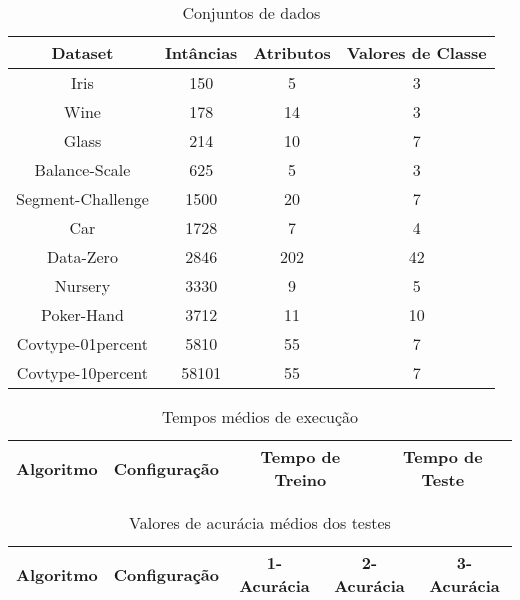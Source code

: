 \begin{table}[h!]
  \begin{center}
    \begin{tabular}{cccc}
      \hline
      Dataset & Intâncias & Atributos & Valores de Classe \\
      \hline

      Iris & 150 & 5 & 3 \\
      Wine & 178 & 14 & 3 \\ 
      Glass & 214 & 10 & 7 \\
      Balance-Scale & 625 & 5 & 3 \\
      Segment-Challenge & 1500 & 20 & 7 \\
      Car & 1728 & 7 & 4 \\
      Data-Zero & 2846 & 202 & 42 \\
      Nursery & 3330 & 9 & 5 \\
      Poker-Hand & 3712 & 11 & 10 \\      
      Covtype-01percent & 5810 & 55 & 7 \\
      Covtype-10percent & 58101 & 55 & 7 \\    

      \hline
    \end{tabular}
    \caption{Conjuntos de dados}
    \label{tab:datasets}
  \end{center}
\end{table}


\begin{table}[h!]
  \begin{center}
    \begin{tabular}{cccc}
      \hline
      Algoritmo & Configuração & Tempo de Treino & Tempo de Teste \\
      \hline


      \hline
    \end{tabular}
    \caption{Tempos médios de execução}
    \label{tab:tempostestes}
  \end{center}
\end{table}


\begin{table}[h!]
  \begin{center}
    \begin{tabular}{ccccc}
      \hline
      Algoritmo & Configuração & 1-Acurácia & 2-Acurácia & 3-Acurácia \\
      \hline


      \hline
    \end{tabular}
    \caption{Valores de acurácia médios dos testes}
    \label{tab:acuracias}
  \end{center}
\end{table}

